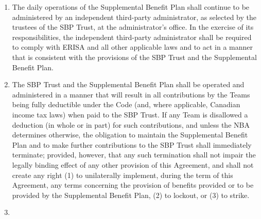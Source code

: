 \documentclass[
]{book}
\begin{document}
\begin{enumerate}
\item
  The daily operations of the Supplemental Benefit Plan shall continue to be administered by an independent third-party administrator, as selected by the trustees of the SBP Trust, at the administrator's office. In the exercise of its responsibilities, the independent third-party administrator shall be required to comply with ERISA and all other applicable laws and to act in a manner that is consistent with the provisions of the SBP Trust and the Supplemental Benefit Plan.
\item
  The SBP Trust and the Supplemental Benefit Plan shall be operated and administered in a manner that will result in all contributions by the Teams being fully deductible under the Code (and, where applicable, Canadian income tax laws) when paid to the SBP Trust. If any Team is disallowed a deduction (in whole or in part) for such contributions, and unless the NBA determines otherwise, the obligation to maintain the Supplemental Benefit Plan and to make further contributions to the SBP Trust shall immediately terminate; provided, however, that any such termination shall not impair the legally binding effect of any other provision of this Agreement, and shall not create any right (1) to unilaterally implement, during the term of this Agreement, any terms concerning the provision of benefits provided or to be provided by the Supplemental Benefit Plan, (2) to lockout, or (3) to strike.
\item

\end{enumerate}
\end{document}
